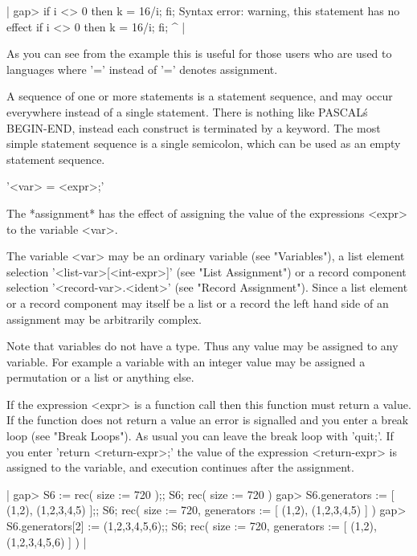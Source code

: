 |    gap> if i <> 0  then  k = 16/i;  fi;
    Syntax error: warning, this statement has no effect
    if i <> 0  then  k = 16/i;  fi;
                             ^ |

As you can see from  the  example this is useful for those  users who are
used to languages where '=' instead of '\:=' denotes assignment.

A sequence  of  one or more  statements is a statement sequence, and  may
occur  everywhere instead of  a single statement.  There  is nothing like
PASCAL\'s  BEGIN-END, instead each  construct is terminated by a keyword.
The most simple  statement sequence is a single  semicolon, which can  be
used as an empty statement sequence.

%

'<var> \:= <expr>;'

The *assignment* has the effect of assigning the value of the expressions
<expr> to the variable <var>.

The variable <var> may be an  ordinary variable (see "Variables"), a list
element selection '<list-var>[<int-expr>]' (see  "List Assignment")  or a
record  component   selection    '<record-var>.<ident>'   (see    "Record
Assignment").  Since a list element or a record component may itself be a
list or a record the  left hand side of  an assignment may be arbitrarily
complex.

Note that variables do  not have a type.  Thus  any value may be assigned
to any variable.   For example a  variable with  an integer  value may be
assigned a permutation or a list or anything else.

If the expression  <expr> is a  function  call then  this  function  must
return a value.   If the  function does not  return a  value  an error is
signalled and you enter a break loop  (see "Break Loops").   As usual you
can leave  the  break   loop   with  'quit;'.    If  you  enter   'return
<return-expr>;' the value of the expression  <return-expr> is assigned to
the variable, and execution continues after the assignment.

|    gap> S6 := rec( size := 720 );; S6;
    rec(
      size := 720 )
    gap> S6.generators := [ (1,2), (1,2,3,4,5) ];; S6;
    rec(
      size := 720,
      generators := [ (1,2), (1,2,3,4,5) ] )
    gap> S6.generators[2] := (1,2,3,4,5,6);; S6;
    rec(
      size := 720,
      generators := [ (1,2), (1,2,3,4,5,6) ] ) |

